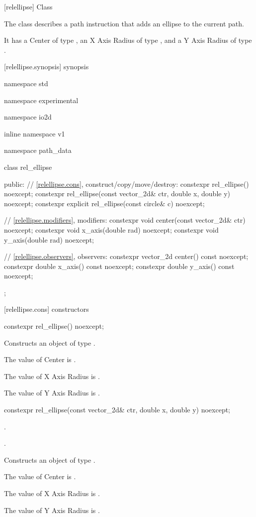  [relellipse] {Class }

\pnum
{}
The class  describes a path instruction that adds an ellipse to the current path.

\pnum
It has a Center of type , an X Axis Radius of type , and a Y Axis Radius of type .

 [relellipse.synopsis] { synopsis}

\begin{codeblock}
namespace std { namespace experimental { namespace io2d { inline namespace v1 {
  namespace path_data {
    class rel_ellipse {
    public:
      // \ref{relellipse.cons}, construct/copy/move/destroy:
      constexpr rel_ellipse() noexcept;
      constexpr rel_ellipse(const vector_2d& ctr, double x, double y) noexcept;
      constexpr explicit rel_ellipse(const circle& c) noexcept;

      // \ref{relellipse.modifiers}, modifiers:
      constexpr void center(const vector_2d& ctr) noexcept;
      constexpr void x_axis(double rad) noexcept;
      constexpr void y_axis(double rad) noexcept;
    
      // \ref{relellipse.observers}, observers:
      constexpr vector_2d center() const noexcept;
      constexpr double x_axis() const noexcept;
      constexpr double y_axis() const noexcept;
    };
  }
} } } }
\end{codeblock}

 [relellipse.cons] { constructors}

\begin{itemdecl}
constexpr rel_ellipse() noexcept;
\end{itemdecl}
\begin{itemdescr}
\pnum
\effects
Constructs an object of type .

\pnum
The value of Center is .

\pnum
The value of X Axis Radius is .

\pnum
The value of Y Axis Radius is .
\end{itemdescr}

\begin{itemdecl}
constexpr rel_ellipse(const vector_2d& ctr, double x, double y) noexcept;
\end{itemdecl}
\begin{itemdescr}
\pnum
\preconditions
{}.

\pnum
{}.

\pnum
\effects
Constructs an object of type .

\pnum
The value of Center is .

\pnum
The value of X Axis Radius is .

\pnum
The value of Y Axis Radius is .
\end{itemdescr}

